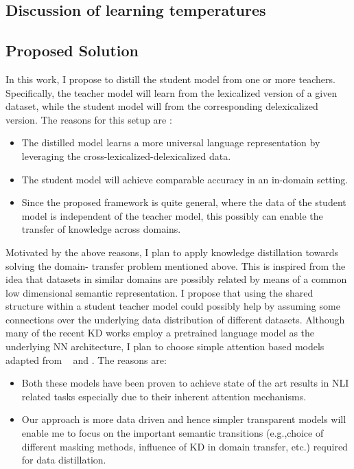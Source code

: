 \documentclass[compsoc,onecolumn]{IEEEtran}
\begin{document}
\subsection{Discussion of learning temperatures}

\subsection{Proposed Solution}

In this work, I propose to distill the student model from one or more teachers. Specifically, the teacher model will learn from the lexicalized version of a given dataset, while the student model will from the corresponding delexicalized version. 
The reasons for this setup are :

\begin{itemize}
  \item The distilled model learns a more universal language representation by leveraging the cross-lexicalized-delexicalized data.
  \item The student model will achieve comparable accuracy in an in-domain setting.
  \item Since the proposed framework is quite general, where the data of the student model is independent of the teacher model, this possibly can enable the transfer of knowledge across domains.
\end{itemize}

Motivated by the above reasons, I plan to apply knowledge distillation towards solving the domain- transfer problem mentioned above. This is inspired from the idea that datasets in similar domains are possibly related by means of a common low dimensional semantic representation. I propose that using the shared structure within a student teacher model could possibly help by assuming some connections over the underlying data distribution of different datasets. Although many of the recent KD works \citep*{jiao2019tinybert,tang2019distilling,zhao2019extreme}  employ a  pretrained language model as the underlying NN architecture, I plan to choose simple attention based models adapted from ~\citep*{parikh2016decomposable} and \citep*{chen2016enhanced} . The reasons are:

\begin{itemize}
  \item Both these models have been proven to achieve state of the art results in NLI related tasks especially due to their inherent attention mechanisms.
  \item Our approach is more data driven and hence simpler transparent models will enable me to focus on the important semantic transitions (e.g.,choice of different masking methods, influence of KD in domain transfer, etc.) required for data distillation.
 \end{itemize}
\end{document}
